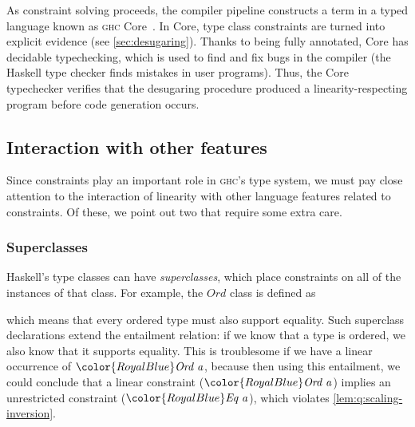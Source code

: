 \documentclass[acmsmall,usenames,dvipsnames,natbib=false,acmthm=false,screen]{acmart}
\newcommand{\Conid}[1]{\mathit{#1}}
\newcommand{\Varid}[1]{\mathit{#1}}
\def\resethooks{%
  \global\let\SaveRestoreHook\empty
  \global\let\ColumnHook\empty}
\let\hspre\empty
\let\hspost\empty
\newcommand{\info}[2][1=]{}
\newcommand{\constraintcolour}{\color{RoyalBlue}}
\newcommand{\constraintfont}[1]{{\constraintcolour#1}}
\newcommand{\constraintop}[1]{\mathop{\constraintfont{#1}}}
\newcommand{\FatArrow}{\constraintop{\Rightarrow}}
\theoremstyle{acmplain}
\theoremstyle{acmdefinition}
\begin{document}
As constraint solving proceeds, the compiler pipeline constructs a
term in a typed language known as \textsc{ghc} Core~\cite{system-fc}.
In Core, type class constraints are turned into explicit evidence (see
\cref{sec:desugaring}). Thanks to being fully annotated, Core has
decidable typechecking, which is used to find and fix bugs in
the compiler (the Haskell type checker finds mistakes in user
programs). Thus, the Core typechecker verifies that the desugaring
procedure produced a linearity-respecting program before code
generation occurs.

\subsection{Interaction with other features}

Since constraints play an important role in \textsc{ghc}'s type system, we must
pay close attention to the interaction of linearity with other language features
related to constraints. Of these, we point out two that require some extra care.
\info{There isn't room to properly explain how we can implement
\ensuremath{\constraintfont{\Conid{Linearly}}} constraints. We don't already speak of
desugaring in the implementation section, so I'd need to give a bit of
context about wrappers or something.

The right approach is to count the number of `Linearly` used. We need
wrappers at the toplevel of definitions, and at each branch of a match
(even if it doesn't introduce an implication, as we may need to adjust
the number of `Linearly` in some branches (presumably by
weakening)). And we do the appropriate amount of
duplications/discards in these wrappers.}

\subsubsection{Superclasses}

Haskell's type classes can have \emph{superclasses}, which place constraints on
all of the instances of that class. For example, the \ensuremath{\Conid{Ord}} class is defined as
\begin{hscode}\SaveRestoreHook
\column{B}{@{}>{\hspre}l<{\hspost}@{}}%
\column{E}{@{}>{\hspre}l<{\hspost}@{}}%
\>[B]{}\;\constraintfont{\Conid{Eq}\;\Varid{a}}\FatArrow \constraintfont{\Conid{Ord}\;\Varid{a}}\;\<[E]%
\ColumnHook
\end{hscode}\resethooks
which means that every ordered type must also support equality. Such
superclass declarations extend the entailment relation: if we know that a type
is ordered, we also know that it supports equality. This is troublesome if we
have a linear occurrence of \ensuremath{\constraintfont{\Conid{Ord}\;\Varid{a}}}, because then using this entailment, we could
conclude that a linear constraint (\ensuremath{\constraintfont{\Conid{Ord}\;\Varid{a}}}) implies an unrestricted constraint
(\ensuremath{\constraintfont{\Conid{Eq}\;\Varid{a}}}), which violates \cref{lem:q:scaling-inversion}.
\end{document}
